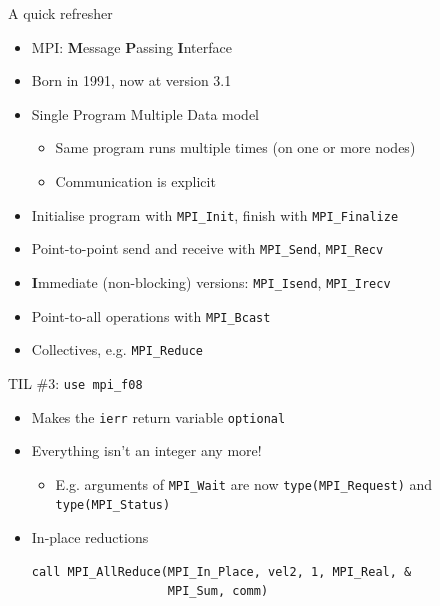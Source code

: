 \documentclass[handout]{beamer}
\begin{document}
\begin{frame}[fragile]{A quick refresher}
	\begin{itemize}[<+->]
		\item MPI: \textbf{M}essage \textbf{P}assing \textbf{I}nterface
		\item Born in 1991, now at version 3.1
		\item Single Program Multiple Data model
		\begin{itemize}[<+->]
			\item Same program runs multiple times (on one or more nodes)
			\item Communication is explicit
		\end{itemize}
		\item Initialise program with \verb|MPI_Init|, finish with \verb|MPI_Finalize|
		\item Point-to-point send and receive with \verb|MPI_Send|, \verb|MPI_Recv|
		\item \textbf{I}mmediate (non-blocking) versions: \verb|MPI_Isend|, \verb|MPI_Irecv|
		\item Point-to-all operations with \verb|MPI_Bcast|
		\item Collectives, e.g. \verb|MPI_Reduce|
	\end{itemize}
\end{frame}

\begin{frame}[fragile]{TIL \#3: \texttt{use mpi\_f08}}
	\begin{itemize}[<+->]
		\item Makes the \texttt{ierr} return variable \texttt{optional}
		\item Everything isn't an integer any more!
		\begin{itemize}[<+->]
			\item E.g. arguments of \verb|MPI_Wait| are now \verb|type(MPI_Request)| and \verb|type(MPI_Status)|
		\end{itemize}
		\item In-place reductions
		\begin{verbatim}
call MPI_AllReduce(MPI_In_Place, vel2, 1, MPI_Real, &
                   MPI_Sum, comm)\end{verbatim}
	\end{itemize}
\end{frame}
\end{document}
